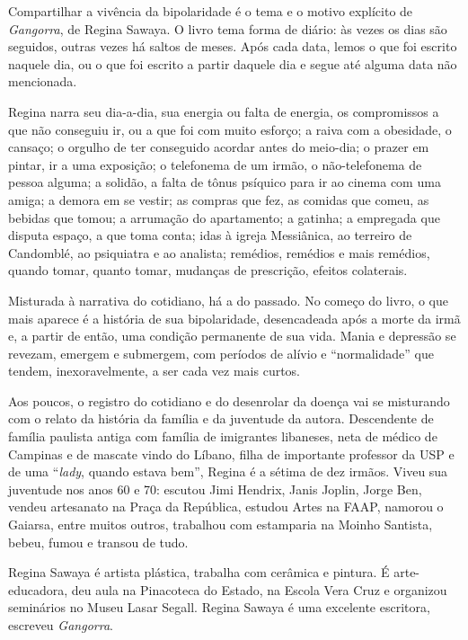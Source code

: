 
{Compartilhar a vivência da bipolaridade} é o tema e o motivo explícito
de \emph{Gangorra}{, de Regina Sawaya. O livro tema forma de diário: às
vezes os dias são seguidos, outras vezes há saltos de meses. Após cada
data, lemos o que foi escrito naquele dia, ou o que foi escrito a partir
daquele dia e segue até alguma data não mencionada.}

{Regina narra seu dia-a-dia, sua energia ou falta de energia, os
compromissos a que não conseguiu ir, ou a que foi com muito esforço; a
raiva com a obesidade, o cansaço; o orgulho de ter conseguido acordar
antes do meio-dia; o prazer em pintar, ir a uma exposição; o telefonema
de um irmão, o não-telefonema de pessoa alguma; a solidão, a falta de
tônus psíquico para ir ao cinema com uma amiga; a demora em se vestir;
as compras que fez, as comidas que comeu, as bebidas que tomou; a
arrumação do apartamento; a gatinha; a empregada que disputa espaço, a
que toma conta; idas à igreja Messiânica, ao terreiro de Candomblé, ao
psiquiatra e ao analista; remédios, remédios e mais remédios, quando
tomar, quanto tomar, mudanças de prescrição, efeitos colaterais.}

{Misturada à narrativa do cotidiano, há a do passado. No começo do
livro, o que mais aparece é a história de sua bipolaridade, desencadeada
após a morte da irmã e, a partir de então, uma condição permanente de
sua vida. Mania e depressão se revezam, emergem e submergem, com
períodos de alívio e ``normalidade'' que tendem, inexoravelmente, a ser
cada vez mais curtos.}

{Aos poucos, o registro do cotidiano e do desenrolar da doença vai se
misturando com o relato da história da família e da juventude da autora.
Descendente de família paulista antiga com família de imigrantes
libaneses, neta de médico de Campinas e de mascate vindo do Líbano,
filha de importante professor da USP e de uma ``}\emph{lady}{, quando
estava bem'', Regina é a sétima de dez irmãos. Viveu sua juventude nos
anos 60 e 70: escutou Jimi Hendrix, Janis Joplin, Jorge Ben, vendeu
artesanato na Praça da República, estudou Artes na FAAP, namorou o
Gaiarsa, entre muitos outros, trabalhou com estamparia na Moinho
Santista, bebeu, fumou e transou de tudo.}

\asterisc

Regina Sawaya é artista plástica, trabalha com cerâmica e pintura. É
arte-educadora, deu aula na Pinacoteca do Estado, na Escola Vera Cruz e
organizou seminários no Museu Lasar Segall. Regina Sawaya é uma
excelente escritora, escreveu \emph{Gangorra}.

